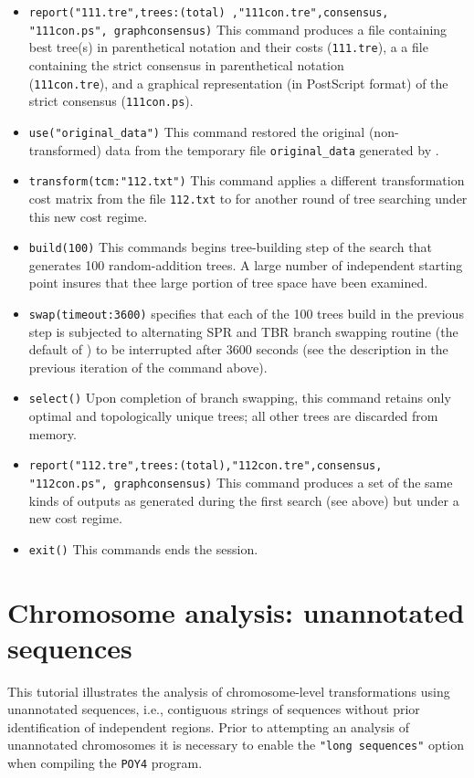 \begin{itemize}
\item \texttt{report("111.tre",trees:(total) ,"111con.tre",consensus,\\"111con.ps", graphconsensus)} This command produces a file containing best tree(s) in parenthetical notation and their costs (\texttt{111.tre}), a a file containing the strict consensus in parenthetical notation \\(\texttt{111con.tre}), and a graphical representation (in PostScript format) of the strict consensus (\texttt{111con.ps}).
\item \texttt{use("original\_data")} This command restored the original (non-trans\-formed) data from the temporary file \texttt{original\_data} generated by .
\item \texttt{transform(tcm:"112.txt")} This command applies a different transformation cost matrix from the file \texttt{112.txt} to for another round of tree searching under this new cost regime.
\item \texttt{build(100)} This commands begins tree-building step of the search that generates 100 random-addition trees. A large number of independent starting point insures that thee large portion of tree space have been examined.
\item \texttt{swap(timeout:3600)}  specifies that each of the 100 trees build in the previous step is subjected to alternating SPR and TBR branch swapping routine (the default of \poy) to be interrupted after 3600 seconds (see the description in the previous iteration of the command above).
\item \texttt{select()} Upon completion of branch swapping, this command retains only optimal and topologically unique trees; all other trees are discarded from memory.
\item \texttt{report("112.tre",trees:(total),"112con.tre",consensus,\\"112con.ps", graphconsensus)} This command produces a set of the same kinds of outputs as generated during the first search (see above) but under a new cost regime.
\item \texttt{exit()} This commands ends the \poy session.
\end{itemize}

\section{Chromosome analysis: unannotated sequences}{\label{tutorial 6}}

This tutorial illustrates the analysis of chromosome-level transformations using 
unannotated sequences, i.e., contiguous strings of sequences without prior 
identification of independent regions. Prior to attempting an analysis of  
unannotated chromosomes it is necessary to enable the \texttt {"long sequences"}
option when compiling the \texttt{POY4} program. 

